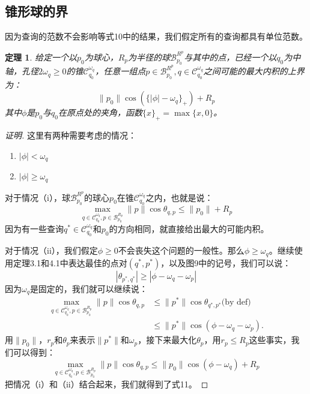 \documentclass[twocolumn]{article}
\begin{document}
\subsection{锥形球的界}
因为查询的范数不会影响等式10中的结果，我们假定所有的查询都具有单位范数。
\newtheorem{theorem3}{定理}[section]
\begin{theorem3}
给定一个以$p_0$为球心，$R_p$为半径的球$\mathcal{B}_{p_0}^{R^p}$与其中的点，已经一个以$q_0$为中轴，孔径$2\omega_q \ge 0$的锥$\mathcal{C}_{q_0}^{\omega_q}$，任意一组点$p\in\mathcal{B}_{p_0}^{R^p},q\in\mathcal{C}_{q_0}^{\omega_q}$之间可能的最大内积的上界为：
\begin{equation}
\|p_0\|\cos(\{|\phi|-\omega_q\}_+)+R_p
\end{equation}
其中$\phi$是$p_0$与$q_0$在原点处的夹角，函数$\{x\}_+ = \max\{x,0\}$。
\end{theorem3}
\begin{proof}[证明]
这里有两种需要考虑的情况：
\begin{enumerate}[label={\roman*}]
\item $|\phi| < \omega_q$
\item $|\phi| \ge \omega_q$
\end{enumerate}
对于情况（i），球$\mathcal{B}_{p_0}^{R^p}$的球心$p_0$在锥$\mathcal{C}_{q_0}^{\omega_q}$之内，也就是说：
\begin{equation}
\max_{q\in\mathcal{C}_{q_0}^{\omega_q},p\in\mathcal{B}_{p_0}^{R_p}}\|p\|\cos\theta_{q,p} \le \|p_0\| + R_p
\end{equation}
因为有一些查询$q^*\in\mathcal{C}_{q_0}^{\omega_q}$和$p_0$的方向相同，就直接给出最大的可能内积。

对于情况（ii），我们假定$\phi\ge0$不会丧失这个问题的一般性。那么$\phi\ge\omega_q$。继续使用定理3.1和4.1中表达最佳的点对$(q^*,p^*)$，以及图9中的记号，我们可以说：
\begin{equation}
|\theta_{p^*,q^*}| \ge | \phi - \omega_q - \omega_p |
\end{equation}
因为$\omega_q$是固定的，我们就可以继续说：
\begin{equation}
\begin{aligned}
\max_{q\in\mathcal{C}_{q_0}^{\omega_q},p\in\mathcal{B}_{p_0}^{R_p}} \|p\|\cos\theta_{q,p} & \le \|p^*\|\cos\theta_{q^*,p^*}\text{(by def)} \\
& \le \|p^*\|\cos(\phi - \omega_q - \omega_p).
\end{aligned}
\end{equation}
用$\|p_0\|$，$r_p$和$\theta_p$来表示$\|p^*\|$和$\omega_p$，接下来最大化$\theta_p$，用$r_p \le R_p$这些事实，我们可以得到：
\begin{equation}
\max_{q\in\mathcal{C}_{q_0}^{\omega_q},p\in\mathcal{B}_{p_0}^{R_p}} \|p\|\cos\theta_{q,p} \le \|p_0\|\cos(\phi - \omega_q) + R_p
\end{equation}
把情况（i）和（ii）结合起来，我们就得到了式11。
\end{proof}
\end{document}
